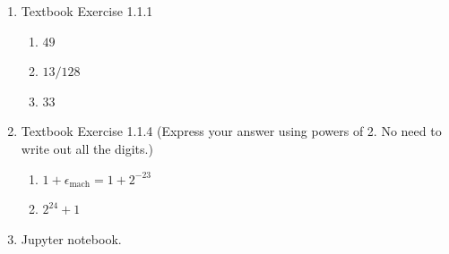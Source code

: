 \documentclass[reqno, answers]{exam}
\begin{document}
\begin{enumerate}
\begin{enumerate}[resume]
  \item $a + (b - c)$
  \item $(a + b) - c$
\end{enumerate}

\begin{solution}
\begin{enumerate}
  \item $a \in \{1, 2, 3, 4, 5, 6, 7, 8, 9\}$
  
  \item $b_i \in \{0, 1, 2, 3, 4, 5, 6, 7, 8, 9\}$
  
  \item $\epsilon_{\text{mach}} = 0.001$
  
  \item $18001$
  
  \item $3.333 \times 10^{-1}$
  
  \item $10001$
  
  \item $8.234 \times 10^{2}$
  
  \item $8.226 \times 10^{2}$

\end{enumerate}
\end{solution}


\item Textbook Exercise 1.1.1

\begin{solution}
  \begin{enumerate}
    \item $49$
    \item $13/128$
    \item $33$
\end{enumerate}

\end{solution}

\item Textbook Exercise 1.1.4 (Express your answer using powers of 2. No need to write out all the digits.)
\begin{solution}
\begin{enumerate}
  \item $1 + \epsilon_{\text{mach}} = 1 + 2^{-23}$
  
  \item $2^{24} + 1$
\end{enumerate}

\end{solution}

\item

Jupyter notebook.

\end{enumerate}
\end{document}
